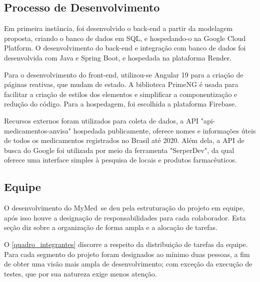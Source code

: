 \documentclass[
	article,			%
	12pt,				%
	oneside,			%
	a4paper,			%
    BIBLATEX,           %
	english,			%
	brazil,				%
	sumario=tradicional
	]{abntex2}
\newcommand\nomeprojeto{MyMed}
\begin{document}
\subsection{Processo de Desenvolvimento}

Em primeira instância, foi desenvolvido o back-end a partir da modelagem proposta, criando o banco de dados em SQL, e hospedando-o na Google Cloud Platform. O desenvolvimento do back-end e integração com banco de dados foi desenvolvida com Java e Spring Boot, e hospedada na plataforma Render.

Para o desenvolvimento do front-end, utilizou-se Angular 19 para a criação de páginas reativas, que mudam de estado. A biblioteca PrimeNG é usada para facilitar a criação de estilos dos elementos e simplificar a componentização e redução do código. Para a hospedagem, foi escolhida a plataforma Firebase.

Recursos externos foram utilizados para coleta de dados, a API "api-medicamentos-anvisa" hospedada publicamente, oferece nomes e informações úteis de todos os medicamentos registrados no Brasil até 2020. Além dela, a API de busca do Google foi utilizada por meio da ferramenta "SerperDev", da qual oferece uma interface simples à pesquisa de locais e produtos farmacêuticos.

\subsection{Equipe}

O desenvolvimento do \nomeprojeto\ se deu pela estruturação do projeto em equipe, após isso houve a designação de responsabilidades para cada colaborador. Esta seção diz sobre a organização de forma ampla e a alocação de tarefas.

O \autoref{quadro_integrantes} discorre a respeito da distribuição de tarefas da equipe. Para cada segmento do projeto foram designados ao mínimo duas pessoas, a fim de obter uma visão mais ampla de desenvolvimento; com exceção da execução de testes, que por sua natureza exige menos atenção. 
\end{document}
